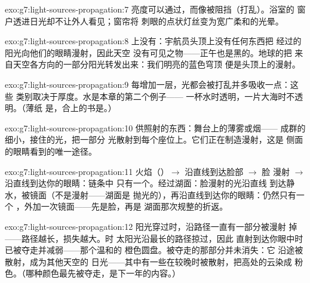 \begin{solution}{exo:g7:light-sources-propagation:7}
亮度可以通过，而像被阻挡（打乱）。浴室的
窗户透进日光却不让外人看见；窗帘将
刺眼的点状灯丝变为宽广柔和的光晕。
\end{solution}

\begin{solution}{exo:g7:light-sources-propagation:8}
上没有：宇航员头顶上没有任何东西把
经过的阳光向他们的眼睛漫射，因此天空
没有可见之物——正午也是黑的。地球的把
来自天空各方向的一部分阳光转发出来：我们明亮的蓝色穹顶
便是头顶上的漫射。
\end{solution}

\begin{solution}{exo:g7:light-sources-propagation:9}
每增加一层，光都会被打乱并多吸收一点：这些
类别取决于厚度。水是本章的第二个例子——
一杯水时透明，一片大海时不透明。（薄纸
是，合上的书是。）
\end{solution}

\begin{solution}{exo:g7:light-sources-propagation:10}
供照射的东西：舞台上的薄雾或烟——
成群的细小，接住的光，把一部分
光散射到每个座位上。它们正在制造漫射，这是
侧面的眼睛看到的唯一途径。
\end{solution}

\begin{solution}{exo:g7:light-sources-propagation:11}
火焰（）$\to$ 沿直线到达脸部 $\to$ 脸
漫射 $\to$ 沿直线到达你的眼睛：链条中
只有一个。经过湖面：脸漫射的光沿直线
到达静水，被镜面（不是漫射——湖面是
抛光的），再沿直线到达你的眼睛：仍然只有一个
\emph{}，外加一次镜面——先是脸，再是
湖面那次规整的折返。
\end{solution}

\begin{solution}{exo:g7:light-sources-propagation:12}
阳光穿过时，沿路径一直有一部分被漫射
掉——路径越长，损失越大。时
太阳光沿最长的路径掠过，因此
直射到达你眼中时已被夺走并减弱——那个温和的
橙色圆盘。被夺走的那部分并未消失：它
沿途被散射，成为其他天空的
日光——其中有一些在较晚时被散射，把高处的云染成
粉色。（哪种颜色最先被夺走，是下一年的内容。）
\end{solution}

